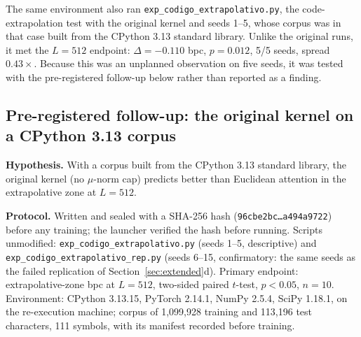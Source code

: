 \documentclass[11pt]{article}
\begin{document}
The same environment also ran \texttt{exp\_codigo\_extrapolativo.py}, the code-extrapolation test with the original kernel and seeds 1--5, whose corpus was in that case built from the CPython 3.13 standard library. Unlike the original runs, it met the $L{=}512$ endpoint: $\Delta = -0.110$ bpc, $p = 0.012$, 5/5 seeds, spread $0.43\times$. Because this was an unplanned observation on five seeds, it was tested with the pre-registered follow-up below rather than reported as a finding.

\subsection{Pre-registered follow-up: the original kernel on a CPython 3.13 corpus}\label{app:followup}

\textbf{Hypothesis.} With a corpus built from the CPython 3.13 standard library, the original kernel (no $\mu$-norm cap) predicts better than Euclidean attention in the extrapolative zone at $L{=}512$.

\begin{sloppypar}
\textbf{Protocol.} Written and sealed with a SHA-256 hash (\texttt{96cbe2bc\ldots a494a9722}) before any training; the launcher verified the hash before running. Scripts unmodified: \texttt{exp\_codigo\_extrapolativo.py} (seeds 1--5, descriptive) and \texttt{exp\_codigo\_extrapolativo\_rep.py} (seeds 6--15, confirmatory: the same seeds as the failed replication of Section~\ref{sec:extended}d). Primary endpoint: extrapolative-zone bpc at $L{=}512$, two-sided paired $t$-test, $p < 0.05$, $n = 10$. Environment: CPython 3.13.15, PyTorch 2.14.1, NumPy 2.5.4, SciPy 1.18.1, on the re-execution machine; corpus of 1{,}099{,}928 training and 113{,}196 test characters, 111 symbols, with its manifest recorded before training.
\end{sloppypar}
\end{document}
